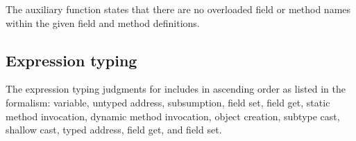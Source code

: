 \documentclass[a4paper,USenglish]{tex/lipics-v2016}
\begin{document}

\begin{mathpar}
\end{mathpar}

The  auxiliary function states that there are no overloaded 
field or method names within the given field and method definitions. \\

\begin{mathpar}


\end{mathpar}

\begin{mathpar}
\end{mathpar}
 
\begin{mathpar}

\end{mathpar}

\begin{mathpar}
\end{mathpar}

\subsection{Expression typing}

The expression typing judgments for \kafka includes in ascending order as listed in the formalism:
variable, untyped address, subsumption, field set, field get, static method invocation, dynamic method invocation, object creation,
subtype cast, shallow cast, typed address,  field get, and  field set.
\end{document}
